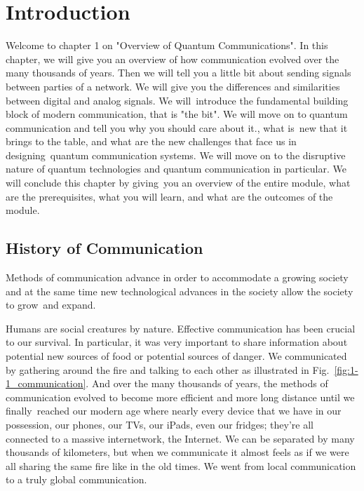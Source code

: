 \chapter[Introduction]{Introduction}
\label{sec:1_Introduction}




Welcome to chapter 1 on "Overview of Quantum Communications".
In this chapter, we will give you an overview of how communication evolved over the many thousands of years. 
Then we will tell you a little bit about sending signals between parties of a network.
We will give you the differences and similarities between digital and analog signals.
We will introduce the fundamental building block of modern communication, that is "the bit".
We will move on to quantum communication and tell you why you should care about it., what is new that it brings to the table, and what are the new challenges that face us in designing quantum communication systems. 
We will move on to the disruptive nature of quantum technologies and quantum communication in particular.
We will conclude this chapter by giving you an overview of the entire module, what are the prerequisites, what you will learn, and what are the outcomes of the module.


\section{History of Communication}

Methods of communication advance in order to accommodate a growing society and at the same time new technological advances in the society allow the society to grow and expand.

Humans are social creatures by nature.
Effective communication has been crucial to our survival.
In particular, it was very important to share information about potential new sources of food or potential sources of danger.
We communicated by gathering around the fire and talking to each other as illustrated in Fig.~\ref{fig:1-1_communication}.
And over the many thousands of years, the methods of communication evolved to become more efficient and more long distance until we finally reached our modern age where nearly every device that we have in our possession, our phones, our TVs, our iPads, even our fridges; they're all connected to a massive internetwork, the Internet.
We can be separated by many thousands of kilometers, but when we communicate it almost feels as if we were all sharing the same fire like in the old times.
We went from local communication to a truly global communication.

